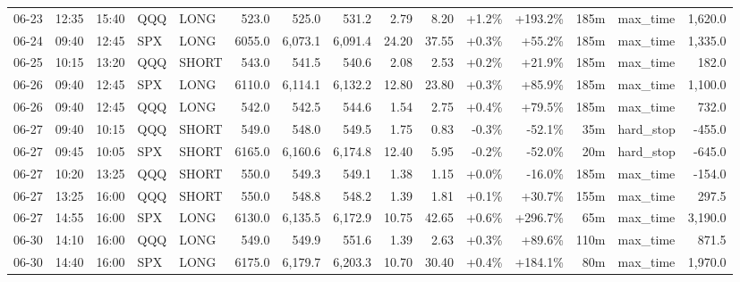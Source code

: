 \documentclass[11pt,a4paper,twoside]{article}
\begin{document}
\begin{landscape}
\begin{center}
\begin{longtable}{>{\color{txtmain}}l l l l l r r r r r r r r >{\color{txtmain}}l r}
06-23 & 12:35 & 15:40 & QQQ & LONG & 523.0 & 525.0 & 531.2 & 2.79 & 8.20 & \textcolor{wingreen}{+1.2\%} & \textcolor{wingreen}{+193.2\%} & 185m & max\_time & \textcolor{wingreen}{1,620.0} \\
06-24 & 09:40 & 12:45 & SPX & LONG & 6055.0 & 6,073.1 & 6,091.4 & 24.20 & 37.55 & \textcolor{wingreen}{+0.3\%} & \textcolor{wingreen}{+55.2\%} & 185m & max\_time & \textcolor{wingreen}{1,335.0} \\
06-25 & 10:15 & 13:20 & QQQ & SHORT & 543.0 & 541.5 & 540.6 & 2.08 & 2.53 & \textcolor{wingreen}{+0.2\%} & \textcolor{wingreen}{+21.9\%} & 185m & max\_time & \textcolor{wingreen}{182.0} \\
06-26 & 09:40 & 12:45 & SPX & LONG & 6110.0 & 6,114.1 & 6,132.2 & 12.80 & 23.80 & \textcolor{wingreen}{+0.3\%} & \textcolor{wingreen}{+85.9\%} & 185m & max\_time & \textcolor{wingreen}{1,100.0} \\
06-26 & 09:40 & 12:45 & QQQ & LONG & 542.0 & 542.5 & 544.6 & 1.54 & 2.75 & \textcolor{wingreen}{+0.4\%} & \textcolor{wingreen}{+79.5\%} & 185m & max\_time & \textcolor{wingreen}{732.0} \\
06-27 & 09:40 & 10:15 & QQQ & SHORT & 549.0 & 548.0 & 549.5 & 1.75 & 0.83 & \textcolor{lossred}{-0.3\%} & \textcolor{lossred}{-52.1\%} & 35m & hard\_stop & \textcolor{lossred}{-455.0} \\
06-27 & 09:45 & 10:05 & SPX & SHORT & 6165.0 & 6,160.6 & 6,174.8 & 12.40 & 5.95 & \textcolor{lossred}{-0.2\%} & \textcolor{lossred}{-52.0\%} & 20m & hard\_stop & \textcolor{lossred}{-645.0} \\
06-27 & 10:20 & 13:25 & QQQ & SHORT & 550.0 & 549.3 & 549.1 & 1.38 & 1.15 & \textcolor{wingreen}{+0.0\%} & \textcolor{lossred}{-16.0\%} & 185m & max\_time & \textcolor{lossred}{-154.0} \\
06-27 & 13:25 & 16:00 & QQQ & SHORT & 550.0 & 548.8 & 548.2 & 1.39 & 1.81 & \textcolor{wingreen}{+0.1\%} & \textcolor{wingreen}{+30.7\%} & 155m & max\_time & \textcolor{wingreen}{297.5} \\
06-27 & 14:55 & 16:00 & SPX & LONG & 6130.0 & 6,135.5 & 6,172.9 & 10.75 & 42.65 & \textcolor{wingreen}{+0.6\%} & \textcolor{wingreen}{+296.7\%} & 65m & max\_time & \textcolor{wingreen}{3,190.0} \\
06-30 & 14:10 & 16:00 & QQQ & LONG & 549.0 & 549.9 & 551.6 & 1.39 & 2.63 & \textcolor{wingreen}{+0.3\%} & \textcolor{wingreen}{+89.6\%} & 110m & max\_time & \textcolor{wingreen}{871.5} \\
06-30 & 14:40 & 16:00 & SPX & LONG & 6175.0 & 6,179.7 & 6,203.3 & 10.70 & 30.40 & \textcolor{wingreen}{+0.4\%} & \textcolor{wingreen}{+184.1\%} & 80m & max\_time & \textcolor{wingreen}{1,970.0} \\

\end{longtable}
\end{center}
\end{landscape}
\end{document}
